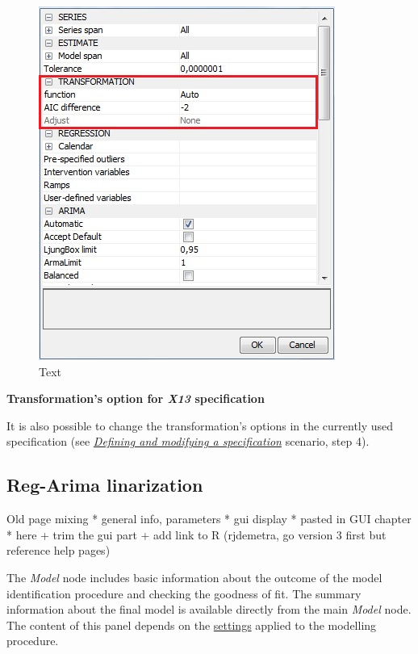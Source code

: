 \documentclass[
  letterpaper,
  DIV=11,
  numbers=noendperiod]{scrreprt}
\begin{document}
\begin{enumerate}
\begin{figure}
  {\centering \includegraphics{./All_images/UG_SA_image40.jpg}

  }

  \caption{Text}

  \end{figure}

  \textbf{Transformation's option for \emph{X13} specification}

  It is also possible to change the transformation's options in the
  currently used specification (see
  \href{../case-studies/detailedsa-spec.html}{\emph{Defining and
  modifying a specification}} scenario, step 4).
\end{enumerate}

\hypertarget{reg-arima-linarization}{%
\subsection{Reg-Arima linarization}\label{reg-arima-linarization}}

Old page mixing * general info, parameters * gui display * pasted in GUI
chapter * here + trim the gui part + add link to R (rjdemetra, go
version 3 first but reference help pages)

The \emph{Model} node includes basic information about the outcome of
the model identification procedure and checking the goodness of fit. The
summary information about the final model is available directly from the
main \emph{Model} node. The content of this panel depends on the
\href{../reference-manual/modelling-specifications.html}{settings}
applied to the modelling procedure.
\end{document}
